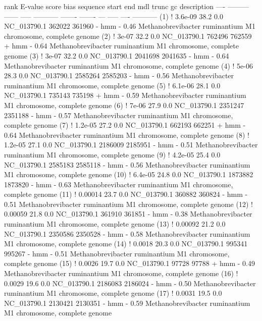 \begin{sreoutput}
 rank     E-value  score  bias  sequence      start     end   mdl trunc   gc  description
 ----   --------- ------ -----  ----------- ------- -------   --- ----- ----  -----------
  (1) !   3.6e-09   38.2   0.0  NC_013790.1  362022  361960 - hmm     - 0.46  Methanobrevibacter ruminantium M1 chromosome, complete genome
  (2) !     3e-07   32.2   0.0  NC_013790.1  762496  762559 + hmm     - 0.64  Methanobrevibacter ruminantium M1 chromosome, complete genome
  (3) !     3e-07   32.2   0.0  NC_013790.1 2041698 2041635 - hmm     - 0.64  Methanobrevibacter ruminantium M1 chromosome, complete genome
  (4) !     5e-06   28.3   0.0  NC_013790.1 2585264 2585203 - hmm     - 0.56  Methanobrevibacter ruminantium M1 chromosome, complete genome
  (5) !   6.1e-06   28.1   0.0  NC_013790.1  735143  735198 + hmm     - 0.59  Methanobrevibacter ruminantium M1 chromosome, complete genome
  (6) !     7e-06   27.9   0.0  NC_013790.1 2351247 2351188 - hmm     - 0.57  Methanobrevibacter ruminantium M1 chromosome, complete genome
  (7) !   1.2e-05   27.2   0.0  NC_013790.1  662193  662251 + hmm     - 0.64  Methanobrevibacter ruminantium M1 chromosome, complete genome
  (8) !   1.2e-05   27.1   0.0  NC_013790.1 2186009 2185951 - hmm     - 0.51  Methanobrevibacter ruminantium M1 chromosome, complete genome
  (9) !   4.2e-05   25.4   0.0  NC_013790.1 2585183 2585118 - hmm     - 0.56  Methanobrevibacter ruminantium M1 chromosome, complete genome
 (10) !   6.4e-05   24.8   0.0  NC_013790.1 1873882 1873820 - hmm     - 0.63  Methanobrevibacter ruminantium M1 chromosome, complete genome
 (11) !   0.00014   23.7   0.0  NC_013790.1  360882  360824 - hmm     - 0.51  Methanobrevibacter ruminantium M1 chromosome, complete genome
 (12) !   0.00059   21.8   0.0  NC_013790.1  361910  361851 - hmm     - 0.38  Methanobrevibacter ruminantium M1 chromosome, complete genome
 (13) !   0.00092   21.2   0.0  NC_013790.1 2350586 2350528 - hmm     - 0.58  Methanobrevibacter ruminantium M1 chromosome, complete genome
 (14) !    0.0018   20.3   0.0  NC_013790.1  995341  995267 - hmm     - 0.51  Methanobrevibacter ruminantium M1 chromosome, complete genome
 (15) !    0.0026   19.7   0.0  NC_013790.1   97728   97788 + hmm     - 0.49  Methanobrevibacter ruminantium M1 chromosome, complete genome
 (16) !    0.0029   19.6   0.0  NC_013790.1 2186083 2186024 - hmm     - 0.50  Methanobrevibacter ruminantium M1 chromosome, complete genome
 (17) !    0.0031   19.5   0.0  NC_013790.1 2130421 2130351 - hmm     - 0.59  Methanobrevibacter ruminantium M1 chromosome, complete genome

\end{sreoutput}

